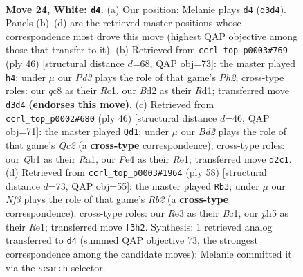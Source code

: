 \documentclass[11pt]{article}
\begin{document}
\clearpage

\begin{figure}[p]\centering
\begin{subfigure}{0.46\textwidth}\centering
\resizebox{\linewidth}{!}{%
\newchessgame
\chessboard[
  setfen={1rq2b2/n1p1r2k/p2p1pp1/3Pp2p/RP2P3/3PRN1P/3B1PP1/1Q3K2 w - - 1 24},
  showmover=false,
  pgfstyle=straightmove, color=movearrow, markmove={d3-d4}
]}
\caption{}
\end{subfigure}\hfill
\begin{subfigure}{0.46\textwidth}\centering
\resizebox{\linewidth}{!}{%
\newchessgame
\chessboard[
  setfen={2rq2k1/1pr2p2/p2ppbp1/P3n2p/1PPN4/4P1P1/Q3BPKP/2RR4 w - - 0 24},
  showmover=false,
  pgfstyle=straightmove, color=movearrow, markmove={h2-h4}
]}
\caption{}
\end{subfigure}
\\[4pt]
\begin{subfigure}{0.46\textwidth}\centering
\resizebox{\linewidth}{!}{%
\newchessgame
\chessboard[
  setfen={2rq1r1k/p3bpp1/1p2p2p/n2pP3/3P1N1P/2P3P1/P1QB1PK1/R3R3 w - - 6 24},
  showmover=false,
  pgfstyle=straightmove, color=movearrow, markmove={c2-d1}
]}
\caption{}
\end{subfigure}\hfill
\begin{subfigure}{0.46\textwidth}\centering
\resizebox{\linewidth}{!}{%
\newchessgame
\chessboard[
  setfen={4r3/p2q1rbk/1p3pp1/2pPp2p/2P1P2P/3Q2P1/PR3PK1/2B1R3 w - - 10 30},
  showmover=false,
  pgfstyle=straightmove, color=movearrow, markmove={b2-b3}
]}
\caption{}
\end{subfigure}
\caption{\textbf{Move 24, White: \texttt{d4}.} (a) Our position; Melanie plays \texttt{d4} (\texttt{d3d4}). Panels (b)--(d) are the retrieved master positions whose correspondence most drove this move (highest QAP objective among those that transfer to it). (b) Retrieved from \texttt{ccrl\_top\_p0003\#769} (ply 46) [structural distance $d$=68, QAP obj=73]: the master played \texttt{h4}; under $\mu$ our \emph{Pd3} plays the role of that game's \emph{Ph2}; cross-type roles: our \emph{q}c8 as their \emph{R}c1, our \emph{B}d2 as their \emph{R}d1; transferred move \texttt{d3d4} \textbf{(endorses this move)}. (c) Retrieved from \texttt{ccrl\_top\_p0002\#680} (ply 46) [structural distance $d$=46, QAP obj=71]: the master played \texttt{Qd1}; under $\mu$ our \emph{Bd2} plays the role of that game's \emph{Qc2} (a \textbf{cross-type} correspondence); cross-type roles: our \emph{Q}b1 as their \emph{R}a1, our \emph{P}e4 as their \emph{R}e1; transferred move \texttt{d2c1}. (d) Retrieved from \texttt{ccrl\_top\_p0003\#1964} (ply 58) [structural distance $d$=73, QAP obj=55]: the master played \texttt{Rb3}; under $\mu$ our \emph{Nf3} plays the role of that game's \emph{Rb2} (a \textbf{cross-type} correspondence); cross-type roles: our \emph{R}e3 as their \emph{B}c1, our \emph{p}h5 as their \emph{R}e1; transferred move \texttt{f3h2}. Synthesis: 1 retrieved analog transferred to \texttt{d4} (summed QAP objective 73, the strongest correspondence among the candidate moves); Melanie committed it via the \texttt{search} selector.}
\label{fig:thought-m46}
\end{figure}
\end{document}
